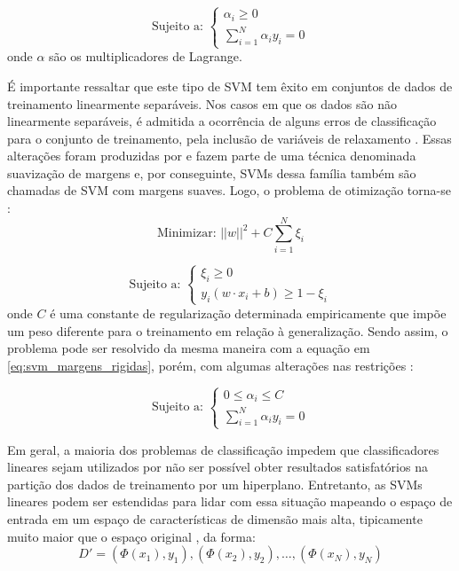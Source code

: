 \begin{equation}
\label{eq:svm_margens_rigidas_restricoes}
\text{Sujeito a: }
\begin{cases}
    \alpha_i \geq 0\\[1em]
    \sum_{i=1}^N \alpha_i y_i = 0
\end{cases}
\end{equation}
\noindent onde $\alpha$ são os multiplicadores de Lagrange.

É importante ressaltar que este tipo de SVM tem êxito em conjuntos de dados de treinamento linearmente separáveis. Nos casos em que os dados são não linearmente separáveis, é admitida a ocorrência de alguns erros de classificação para o conjunto de treinamento, pela inclusão de variáveis de relaxamento \citep{lorena:03}. Essas alterações foram produzidas por \citet{cortes:95} e fazem parte de uma técnica denominada suavização de margens e, por conseguinte, SVMs dessa família também são chamadas de SVM com margens suaves. Logo, o problema de otimização torna-se \citep{lorena:03}:
\begin{equation}
\label{eq:svm_margens_suaves_def}
\text{Minimizar: } ||w||^2 + C\sum_{i=1}^N \xi_i
\end{equation}

\begin{equation}
\label{eq:svm_margens_suaves_def_restricoes}
\text{Sujeito a: }
\begin{cases}
    \xi_i \geq 0\\[1em]
    y_i (w \cdot x_i + b) \geq 1 - \xi_i
\end{cases}
\end{equation}
\noindent onde $C$ é uma constante de regularização determinada empiricamente que impõe um peso diferente para o treinamento em relação à generalização. Sendo assim, o problema pode ser resolvido da mesma maneira com a equação em \ref{eq:svm_margens_rigidas}, porém, com algumas alterações nas restrições \citep{lorena:03}:

\begin{equation}
\label{eq:svm_margens_suaves_restricoes}
\text{Sujeito a: }
\begin{cases}
    0 \leq \alpha_i \leq C\\[1em]
    \sum_{i=1}^N \alpha_i y_i = 0
\end{cases}
\end{equation}

Em geral, a maioria dos problemas de classificação impedem que classificadores lineares sejam utilizados por não ser possível obter resultados satisfatórios na partição dos dados de treinamento por um hiperplano. Entretanto, as SVMs lineares podem ser estendidas para lidar com essa situação mapeando o espaço de entrada em um espaço de características de dimensão mais alta, tipicamente muito maior que o espaço original \citep{duda:12}, da forma:
\begin{equation}
\label{eq:svm_dataset_transformado}
    D' = (\Phi(x_1), y_1), (\Phi(x_2), y_2), \ldots, (\Phi(x_N), y_N)
\end{equation}


